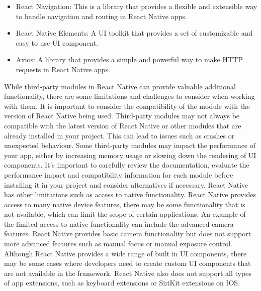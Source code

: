 \begin{itemize}
    \item React Navigation: This is a library that provides a flexible and extensible way to handle navigation and routing in React Native apps.
    \item React Native Elements: A UI toolkit that provides a set of customizable and easy to use UI component.
    \item Axios: A library that provides a simple and powerful way to make HTTP requests in React Native apps.
\end{itemize}
While third-party modules in React Native can provide valuable additional functionality, there are some limitations and challenges to consider when working with them.
\newline \newline
 It is important to consider the compatibility of the module with the version of React Native being used. Third-party modules may not always be compatible with the latest version of React Native or other modules that are already installed in your project. This can lead to issues such as crashes or unexpected behaviour. Some third-party modules may impact the performance of your app, either by increasing memory usage or slowing down the rendering of UI components. It’s important to carefully review the documentation, evaluate the performance impact and compatibility information for each module before installing it in your project and consider alternatives if necessary.
 \newline \newline
React Native has other limitations \cite{RNlimitation} such as access to native functionality. React Native provides access to many native device features, there may be some functionality that is not available, which can limit the scope of certain applications. An example of the limited access to native functionality can include the advanced camera features. React Native provides basic camera functionality but does not support more advanced features such as manual focus or manual exposure control. Although React Native provides a wide range of built in UI components, there may be some cases where developers need to create custom UI components that are not available in the framework. React Native also does not support all types of app extensions, such as keyboard extensions or SiriKit extensions on IOS.
\newline \newline
